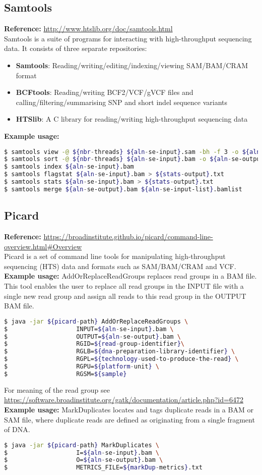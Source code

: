 \documentclass[8pt]{article}
\begin{document}
\subsection*{Samtools}
\textbf{Reference:} \url{http://www.htslib.org/doc/samtools.html}\\
Samtools is a suite of programs for interacting with high-throughput sequencing data. It consists of three separate repositories:
\begin{itemize}
	\item \textbf{Samtools}: Reading/writing/editing/indexing/viewing SAM/BAM/CRAM format
	\item \textbf{BCFtools}: Reading/writing BCF2/VCF/gVCF files and calling/filtering/summarising SNP and short indel sequence variants
	\item \textbf{HTSlib}: A C library for reading/writing high-throughput sequencing data
\end{itemize}
\textbf{Example usage:}
\begin{lstlisting}[language=bash]
$ samtools view -@ ${nbr-threads} ${aln-se-input}.sam -bh -f 3 -o ${aln-se-output}.bam
$ samtools sort -@ ${nbr-threads} ${aln-se-input}.bam -o ${aln-se-output}.bam
$ samtools index ${aln-se-input}.bam
$ samtools flagstat ${aln-se-input}.bam > ${stats-output}.txt
$ samtools stats ${aln-se-input}.bam > ${stats-output}.txt
$ samtools merge ${aln-se-output}.bam ${aln-se-input-list}.bamlist
\end{lstlisting}
\subsection*{Picard}
\textbf{Reference:} \url{https://broadinstitute.github.io/picard/command-line-overview.html#Overview}\\
Picard is a set of command line tools for manipulating high-throughput sequencing (HTS) data and formats such as SAM/BAM/CRAM and VCF.\\
\textbf{Example usage:} AddOrReplaceReadGroups replaces read groups in a BAM file. This tool enables the user to replace all read groups in the INPUT file with a single new read group and assign all reads to this read group in the OUTPUT BAM file.
\begin{lstlisting}[language=bash]
$ java -jar ${picard-path} AddOrReplaceReadGroups \
$					INPUT=${aln-se-input}.bam \
$					OUTPUT=${aln-se-output}.bam \
$					RGID=${read-group-identifier}\
$					RGLB=${dna-preparation-library-identifier} \
$					RGPL=${technology-used-to-produce-the-read} \
$					RGPU=${platform-unit} \
$					RGSM=${sample}
\end{lstlisting}
For meaning of the read group see \url{https://software.broadinstitute.org/gatk/documentation/article.php?id=6472}\\
\textbf{Example usage:} MarkDuplicates locates and tags duplicate reads in a BAM or SAM file, where duplicate reads are defined as originating from a single fragment of DNA. 
\begin{lstlisting}[language=bash]
$ java -jar ${picard-path} MarkDuplicates \
$					I=${aln-se-input}.bam \
$					O=${aln-se-output}.bam \
$					METRICS_FILE=${markDup-metrics}.txt
\end{lstlisting}
\end{document}
